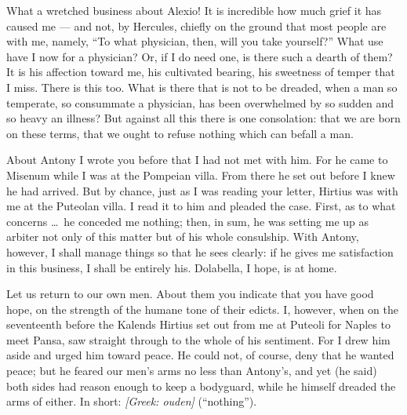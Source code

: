 

 What a wretched business about Alexio! It is incredible how much grief it has caused me --- and not, by Hercules, chiefly on the ground that most people are with me, namely, ``To what physician, then, will you take yourself?'' What use have I now for a physician? Or, if I do need one, is there such a dearth of them? It is his affection toward me, his cultivated bearing, his sweetness of temper that I miss. There is this too. What is there that is not to be dreaded, when a man so temperate, so consummate a physician, has been overwhelmed by so sudden and so heavy an illness? But against all this there is one consolation: that we are born on these terms, that we ought to refuse nothing which can befall a man.

 About Antony I wrote you before that I had not met with him. For he came to Misenum while I was at the Pompeian villa. From there he set out before I knew he had arrived. But by chance, just as I was reading your letter, Hirtius was with me at the Puteolan villa. I read it to him and pleaded the case. First, as to what concerns \dots\ he conceded me nothing; then, in sum, he was setting me up as arbiter not only of this matter but of his whole consulship. With Antony, however, I shall manage things so that he sees clearly: if he gives me satisfaction in this business, I shall be entirely his. Dolabella, I hope, is at home.

 Let us return to our own men. About them you indicate that you have good hope, on the strength of the humane tone of their edicts. I, however, when on the seventeenth before the Kalends Hirtius set out from me at Puteoli for Naples to meet Pansa, saw straight through to the whole of his sentiment. For I drew him aside and urged him toward peace. He could not, of course, deny that he wanted peace; but he feared our men's arms no less than Antony's, and yet (he said) both sides had reason enough to keep a bodyguard, while he himself dreaded the arms of either. In short: \textit{[Greek: ouden]} (``nothing'').

